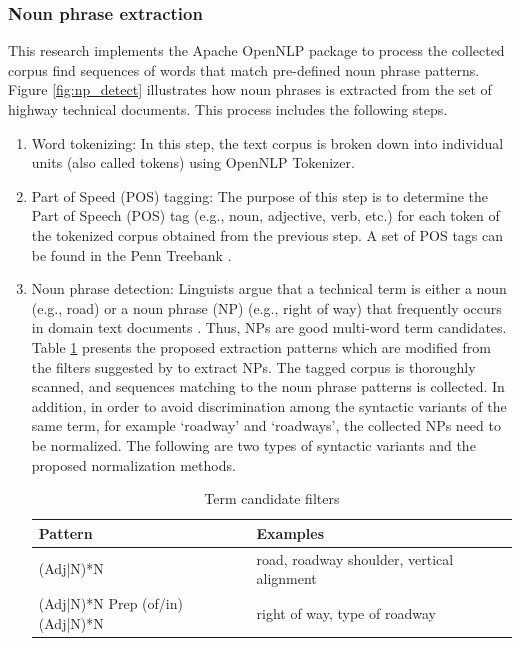 \documentclass[Journal,InsideFigs, DoubleSpace]{ascelike} %
\begin{document}
\subsubsection{Noun phrase extraction}
%
This research implements the Apache OpenNLP package to process the collected corpus find sequences of words that match pre-defined noun phrase patterns. Figure \ref{fig:np_detect} illustrates how noun phrases is extracted from the set of highway technical documents. This process includes the following steps. %
\begin{enumerate} [label=\roman*]
\item Word tokenizing: In this step, the text corpus is broken down into individual units (also called tokens) using OpenNLP Tokenizer.
\item Part of Speed (POS) tagging: The purpose of this step is to determine the Part of Speech (POS) tag (e.g., noun, adjective, verb, etc.) for each token of the tokenized corpus obtained from the previous step. A set of POS tags can be found in the Penn Treebank \cite{marcus93}.
\item Noun phrase detection: Linguists argue that a technical term is either a noun (e.g., road) or a noun phrase (NP) (e.g., right of way) that frequently occurs in domain text documents \cite{justeson95}. Thus, NPs are good multi-word term candidates. Table \ref{table:term_filter} presents the proposed extraction patterns which are modified from the filters suggested by  to extract NPs. The tagged corpus is thoroughly scanned, and sequences matching to the noun phrase patterns is collected. 
	In addition, in order to avoid discrimination among the syntactic variants of the same term, for example `roadway' and `roadways', the collected NPs need to be normalized. The following are two types of syntactic variants and the proposed normalization methods.
	\begin{table} [t]
		\caption{Term candidate filters}
		\label{table:term_filter}
		\centering
		\small
		\renewcommand{\arraystretch}{1.25}
		\begin{tabular}{l l}
			\hline
			\textbf{Pattern} & \textbf{Examples}\\
			\hline
			(Adj|N)*N		& road, roadway shoulder, vertical alignment\\
			(Adj|N)*N Prep (of/in) (Adj|N)*N	&	right of way, type of roadway\\

\end{tabular}
\end{table}
\end{enumerate}
\end{document}
